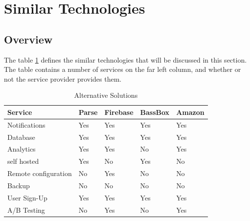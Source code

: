 
\section{Similar Technologies}

\subsection{Overview}

The table \ref{fig:overview} defines the similar technologies that will be discussed in this section. The table contains a number of services on the far left column, and whether or not the service provider provides them.

\begin{table}[!h]
\centering
\caption{Alternative Solutions}
\label{fig:overview}
\begin{tabular}{|l|l|l|l|l|}
\hline
\cellcolor{green!20}Service &\cellcolor{green!20}Parse &\cellcolor{green!20}Firebase &\cellcolor{green!20}BassBox &\cellcolor{green!20}Amazon \\ \hline
Notifications               & Yes                      & Yes                         & Yes                        & Yes\\ \hline
Database                    & Yes                      & Yes                         & Yes                        & Yes\\ \hline
Analytics                   & Yes                      & Yes                         & No                         & Yes\\ \hline
self hosted                 & Yes                      & No                          & Yes                        & No \\ \hline
Remote configuration        & No                       & Yes                         & No                         & No \\ \hline
Backup                      & No                       & No                          & No                         & No \\ \hline
User Sign-Up                & Yes                      & Yes                         & Yes                        & Yes\\ \hline
A/B Testing                 & No                       & Yes                         & No                         & Yes\\ \hline
\end{tabular}
\end{table}


